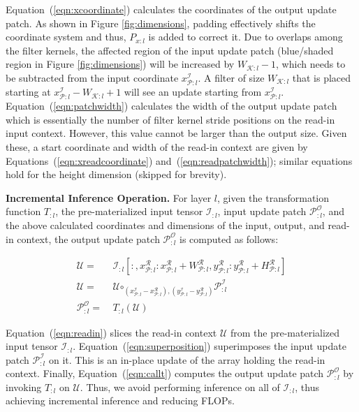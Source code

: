 Equation~(\ref{eqn:xcoordinate}) calculates the coordinates of the output update patch.
As shown in Figure \ref{fig:dimensions}, padding effectively shifts the coordinate system and thus, $P_{x:l}$ is added to correct it.
Due to overlaps among the filter kernels, the affected region of the input update patch (blue/shaded region in Figure \ref{fig:dimensions}) will be increased by $W_{\mathcal{K}:l}-1$, which needs to be subtracted from the input coordinate $x^\mathcal{I}_{\mathcal{P}:l}$.
A filter of size $W_{\mathcal{K}:l}$ that is placed starting at $x^\mathcal{I}_{\mathcal{P}:l} - W_{\mathcal{K}:l} + 1$ will see an update starting from $x^\mathcal{I}_{\mathcal{P}:l}$.
Equation~(\ref{eqn:patchwidth}) calculates the width of the output update patch which is essentially the number of filter kernel stride positions on the read-in input context. However, this value cannot be larger than the output size.
Given these, a start coordinate and width of the read-in context are given by Equations~(\ref{eqn:xreadcoordinate}) and~(\ref{eqn:readpatchwidth}); similar equations hold for the height dimension (skipped for brevity).


\vspace{2mm}
\noindent \textbf{Incremental Inference Operation.}
For layer $l$, given the transformation function $T_{:l}$, the pre-materialized input tensor $\mathcal{I}_{:l}$, input update patch $\mathcal{P}^\mathcal{O}_{:l}$, and the above calculated coordinates and dimensions of the input, output, and read-in context, the output update patch $\mathcal{P}^\mathcal{O}_{:l}$ is computed as follows:

\vspace{-2mm}
\begin{align}
\label{eqn:readin}
\mathcal{U} =&~ \mathcal{I}_{:l}[:,x^\mathcal{R}_{\mathcal{P}:l}:x^\mathcal{R}_{\mathcal{P}:l}+W^\mathcal{R}_{\mathcal{P}:l}, y^\mathcal{R}_{\mathcal{P}:l}: y^\mathcal{R}_{\mathcal{P}:l}+ H^\mathcal{R}_{\mathcal{P}:l}]\\
\label{eqn:superposition}
\mathcal{U} =&~ \mathcal{U} \bm\circ_{(x^\mathcal{I}_{\mathcal{P}:l}-x^\mathcal{R}_{\mathcal{P}:l}),(y^\mathcal{I}_{\mathcal{P}:l}-y^\mathcal{R}_{\mathcal{P}:l})} \mathcal{P}^{\mathcal{I}}_{:l}\\
\label{eqn:callt}
\mathcal{P}^\mathcal{O}_{:l} =&~ T_{:l}(\mathcal{U})
\end{align}

Equation~(\ref{eqn:readin}) slices the read-in context $\mathcal{U}$ from the pre-materialized input tensor $\mathcal{I}_{:l}$. Equation~(\ref{eqn:superposition}) superimposes the input update patch $\mathcal{P}^\mathcal{I}_{:l}$ on it. This is an in-place update of the array holding the read-in context. Finally, Equation~(\ref{eqn:callt}) computes the output update patch $\mathcal{P}^{\mathcal{O}}_{:l}$ by invoking $T_{:l}$ on $\mathcal{U}$. Thus, we avoid performing inference on all of $\mathcal{I}_{:l}$, thus achieving incremental inference and reducing FLOPs.


